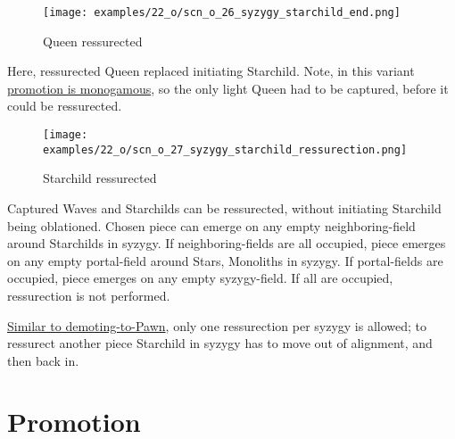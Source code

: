 \clearpage %

\vspace*{-2.1\baselineskip}
\noindent
\begin{figure}[!h]
\texttt{[image: examples/22\_o/scn\_o\_26\_syzygy\_starchild\_end.png]}
\caption{Queen ressurected}
\label{fig:scn_o_26_syzygy_starchild_end}
\end{figure}

Here, ressurected Queen replaced initiating Starchild. Note, in this variant
\hyperref[sec:One/Promotion]{promotion is monogamous}, so the only light Queen
had to be captured, before it could be ressurected.

\clearpage %

\vspace*{-2.1\baselineskip}
\noindent
\begin{figure}[!h]
\texttt{[image: examples/22\_o/scn\_o\_27\_syzygy\_starchild\_ressurection.png]}
\caption{Starchild ressurected}
\label{fig:scn_o_27_syzygy_starchild_ressurection}
\end{figure}

Captured Waves and Starchilds can be ressurected, without initiating Starchild being oblationed. Chosen
piece can emerge on any empty neighboring-field around Starchilds in syzygy. If neighboring-fields are
all occupied, piece emerges on any empty portal-field around Stars, Monoliths in syzygy. If portal-fields
are occupied, piece emerges on any empty syzygy-field. If all are occupied, ressurection is not performed.

\clearpage %

\hyperref[fig:scn_d_16_syzygy_2_stars_steps]{Similar to demoting-to-Pawn}, only one ressurection per syzygy is
allowed; to ressurect another piece Starchild in syzygy has to move out of alignment, and then back in.

\section*{Promotion}
\label{sec:One/Promotion}

